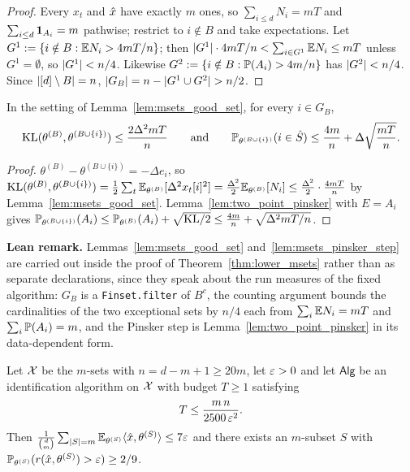 \begin{proof}
Every $x_t$ and $\hat{x}$ have exactly $m$ ones, so $\sum_{i\le d}N_i = mT$ and
$\sum_{i\le d}\mathbf{1}_{A_i} = m$ pathwise; restrict to $i \notin B$ and take expectations.
Let $G^1 := \{i\notin B : \mathbb{E} N_i > 4mT/n\}$; then $\lvert G^1 \rvert\cdot 4mT/n < \sum_{i\in G^1}\mathbb{E} N_i \le mT$
unless $G^1 = \emptyset$, so $\lvert G^1 \rvert < n/4$. Likewise
$G^2 := \{i \notin B : \mathbb{P}(A_i) > 4m/n\}$ has $\lvert G^2 \rvert < n/4$. Since
$\lvert [d]\setminus B \rvert = n$, $\lvert G_B \rvert = n - \lvert G^1\cup G^2 \rvert > n/2$.
\end{proof}

\begin{lemma}\label{lem:msets_pinsker_step}
In the setting of Lemma~\ref{lem:msets_good_set}, for every $i \in G_B$,
\[
  \mathrm{KL}(\theta^{(B)}, \theta^{(B\cup\{i\})}) \le \frac{2\Delta^2 mT}{n}
  \qquad\text{and}\qquad
  \mathbb{P}_{\theta^{(B\cup\{i\})}}(i \in \hat S) \le \frac{4m}{n} + \Delta\sqrt{\frac{mT}{n}} .
\]
\end{lemma}

\begin{proof}
$\theta^{(B)} - \theta^{(B\cup\{i\})} = -\Delta e_i$, so
$\mathrm{KL}(\theta^{(B)},\theta^{(B\cup\{i\})}) = \frac12\sum_t\mathbb{E}_{\theta^{(B)}}[\Delta^2x_t[i]^2]
= \frac{\Delta^2}{2}\mathbb{E}_{\theta^{(B)}}[N_i] \le \frac{\Delta^2}{2}\cdot\frac{4mT}{n}$ by
Lemma~\ref{lem:msets_good_set}. Lemma~\ref{lem:two_point_pinsker} with $E = A_i$ gives
$\mathbb{P}_{\theta^{(B\cup\{i\})}}(A_i) \le \mathbb{P}_{\theta^{(B)}}(A_i) + \sqrt{\mathrm{KL}/2}
\le \frac{4m}{n} + \sqrt{\Delta^2mT/n}$.
\end{proof}

\textbf{Lean remark.} Lemmas~\ref{lem:msets_good_set} and~\ref{lem:msets_pinsker_step} are
carried out inside the proof of Theorem~\ref{thm:lower_msets} rather than as separate
declarations, since they speak about the run measures of the fixed algorithm: $G_B$ is a
\texttt{Finset.filter} of $B^c$, the counting argument bounds the cardinalities of the two
exceptional sets by $n/4$ each from $\sum_{i}\mathbb{E} N_i = mT$ and $\sum_i\mathbb{P}(A_i) = m$, and the
Pinsker step is Lemma~\ref{lem:two_point_pinsker} in its data-dependent form.

\begin{theorem}\label{thm:lower_msets}
\leanok
{}
Let $\mathcal{X}$ be the $m$-sets with $n = d - m + 1 \ge 20m$, let $\varepsilon > 0$ and let
$\mathsf{Alg}$ be an identification algorithm on $\mathcal{X}$ with budget $T \ge 1$ satisfying
\[
  T \le \frac{m\,n}{2500\,\varepsilon^2}.
\]
Then $\frac{1}{\binom dm}\sum_{\lvert S \rvert = m}\mathbb{E}_{\theta^{(S)}}\langle \hat{x}, \theta^{(S)} \rangle \le 7\varepsilon$ and
there exists an $m$-subset $S$ with $\mathbb{P}_{\theta^{(S)}}(r(\hat{x},\theta^{(S)}) > \varepsilon) \ge 2/9$.
\end{theorem}

